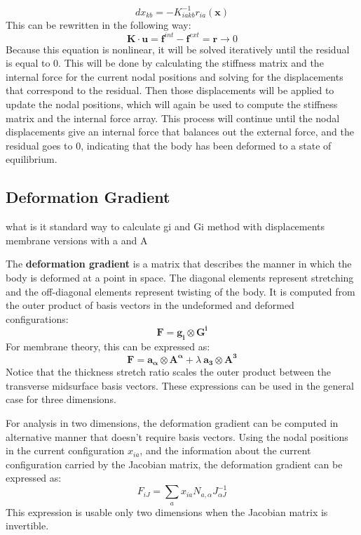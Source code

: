 \documentclass[]{spie}  %
\begin{document}
\begin{equation}
dx_{kb} = -K^{-1}_{iakb} r_{ia}(\bm{x})
\end{equation}
This can be rewritten in the following way:
\begin{equation}
\label{eq: displacement solving equation}
\bm{K} \cdot \bm{u} = \bm{f}^{int} - \bm{f}^{ext} = \bm{r} \rightarrow 0
\end{equation}
Because this equation is nonlinear, it will be solved iteratively until the residual is equal to 0. This will be done by calculating the stiffness matrix and the internal force for the current nodal positions and solving for the displacements that correspond to the residual. Then those displacements will be applied to update the nodal positions, which will again be used to compute the stiffness matrix and the internal force array. This process will continue until the nodal displacements give an internal force that balances out the external force, and the residual goes to 0, indicating that the body has been deformed to a state of equilibrium.


\subsection{Deformation Gradient}
what is it
standard way to calculate gi and Gi
method with displacements
membrane versions with a and A

The \textbf{deformation gradient} is a matrix that describes the manner in which the body is deformed at a point in space. The diagonal elements represent stretching and the off-diagonal elements represent twisting of the body. It is computed from the outer product of basis vectors in the undeformed and deformed configurations:
\begin{equation}
\label{eq: deformation gradient}
\bm{F} = \bm{g_i} \otimes \bm{G^i}
\end{equation}
For membrane theory, this can be expressed as:
\begin{equation}
\label{eq: deformation gradient membrane theory}
\bm{F} = \bm{a_\alpha} \otimes \bm{A^\alpha} + \lambda \ \bm{a_3} \otimes \bm{A^3}
\end{equation}
Notice that the thickness stretch ratio scales the outer product between the transverse midsurface basis vectors. These expressions can be used in the general case for three dimensions. 

For analysis in two dimensions, the deformation gradient can be computed in alternative manner that doesn't require basis vectors. Using the nodal positions in the current configuration $x_{ia}$, and the information about the current configuration carried by the Jacobian matrix, the deformation gradient can be expressed as:
\begin{equation}
\label{eq: deformation gradient using Jacobian matrix}
F_{iJ} = \sum\limits_{a} x_{ia} N_{a,\alpha} J_{\alpha J}^{-1}
\end{equation}
This expression is usable only two dimensions when the Jacobian matrix is invertible. 
\end{document}
